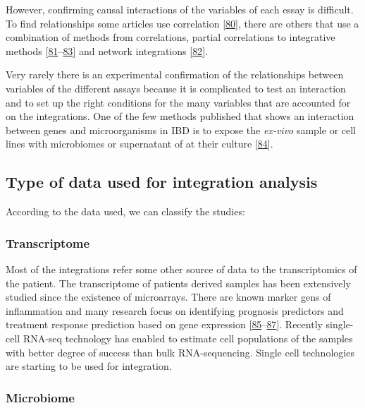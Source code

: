 \documentclass[
  12pt,
  a4paper,
  twoside,
  openright]{book}
\begin{document}
However, confirming causal interactions of the variables of each essay is difficult.
To find relationships some articles use correlation {[}\protect\hyperlink{ref-hasler_uncoupling_2016}{80}{]}, there are others that use a combination of methods from correlations, partial correlations to integrative methods {[}\protect\hyperlink{ref-tang2017}{81}--\protect\hyperlink{ref-huWholeExomeSequencing2021}{83}{]} and network integrations {[}\protect\hyperlink{ref-hernuxe1ndez-rocha2021}{82}{]}.

Very rarely there is an experimental confirmation of the relationships between variables of the different assays because it is complicated to test an interaction and to set up the right conditions for the many variables that are accounted for on the integrations.
One of the few methods published that shows an interaction between genes and microorganisms in IBD is to expose the \emph{ex-vivo} sample or cell lines with microbiomes or supernatant of at their culture {[}\protect\hyperlink{ref-mayorgas2021}{84}{]}.

\hypertarget{data-origin}{%
\subsection{Type of data used for integration analysis}\label{data-origin}}

According to the data used, we can classify the studies:

\hypertarget{transcriptome}{%
\subsubsection{Transcriptome}\label{transcriptome}}

Most of the integrations refer some other source of data to the transcriptomics of the patient.
The transcriptome of patients derived samples has been extensively studied since the existence of microarrays.
There are known marker gens of inflammation and many research focus on identifying prognosis predictors and treatment response prediction based on gene expression {[}\protect\hyperlink{ref-planell2013}{85}--\protect\hyperlink{ref-massimino2021}{87}{]}.
Recently single-cell RNA-seq technology has enabled to estimate cell populations of the samples with better degree of success than bulk RNA-sequencing.
Single cell technologies are starting to be used for integration.

\hypertarget{microbiome-1}{%
\subsubsection{Microbiome}\label{microbiome-1}}
\end{document}
